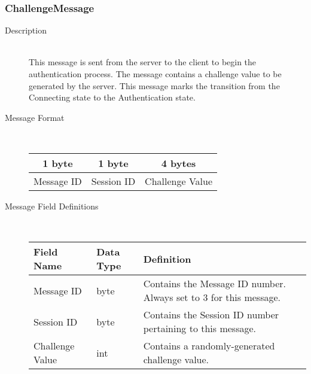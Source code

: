 \documentclass[12pt,letterpaper,titlepage]{article}
\begin{document}
\subsubsection{ChallengeMessage}
	\begin{description}
	\item[Description] \hfill \\
		This message is sent from the server to the client to begin the authentication process.  
		The message contains a challenge value to be generated by the server.  This message marks 
		the transition from the Connecting state to the Authentication state. 	
	\item[Message Format] \hfill \\
	\begin{tabular}{ | c | c | c | }
		\hline
		1 byte & 1 byte & 4 bytes \\
		\hline
		Message ID & Session ID &  Challenge Value \\
		\hline
	\end{tabular}
	\item[Message Field Definitions] \hfill \\
	\begin{tabular}{ | p{3cm} | p{1cm} | p{8cm} | }
		\hline
		Field Name & Data Type & Definition \\
		\hline
		Message ID & byte & Contains the Message ID number. 
					\newline Always set to 3 for this message. \\
		\hline
		Session ID & byte & Contains the Session ID number pertaining to this message. \\
		\hline
		Challenge Value & int & Contains a randomly-generated challenge value. \\
		\hline
	\end{tabular}
	\end{description}
\end{document}
